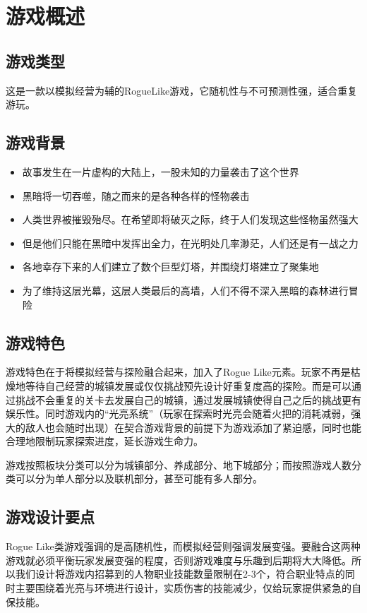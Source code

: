 \section{游戏概述}

\subsection{游戏类型}
这是一款以模拟经营为辅的RogueLike游戏，它随机性与不可预测性强，适合重复游玩。

\subsection{游戏背景}
\begin{itemize}
    \item 故事发生在一片虚构的大陆上，一股未知的力量袭击了这个世界
    \item 黑暗将一切吞噬，随之而来的是各种各样的怪物袭击
    \item 人类世界被摧毁殆尽。在希望即将破灭之际，终于人们发现这些怪物虽然强大
    \item 但是他们只能在黑暗中发挥出全力，在光明处几率渺茫，人们还是有一战之力
    \item 各地幸存下来的人们建立了数个巨型灯塔，并围绕灯塔建立了聚集地
    \item 为了维持这层光幕，这层人类最后的高墙，人们不得不深入黑暗的森林进行冒险
\end{itemize}

\subsection{游戏特色}
游戏特色在于将模拟经营与探险融合起来，加入了Rogue Like元素。玩家不再是枯燥地等待自己经营的城镇发展或仅仅挑战预先设计好重复度高的探险。而是可以通过挑战不会重复的关卡去发展自己的城镇，通过发展城镇使得自己之后的挑战更有娱乐性。同时游戏内的“光亮系统”（玩家在探索时光亮会随着火把的消耗减弱，强大的敌人也会随时出现）在契合游戏背景的前提下为游戏添加了紧迫感，同时也能合理地限制玩家探索进度，延长游戏生命力。

游戏按照板块分类可以分为城镇部分、养成部分、地下城部分；而按照游戏人数分类可以分为单人部分以及联机部分，甚至可能有多人部分。


\subsection{游戏设计要点}
Rogue Like类游戏强调的是高随机性，而模拟经营则强调发展变强。要融合这两种游戏就必须平衡玩家发展变强的程度，否则游戏难度与乐趣到后期将大大降低。所以我们设计将游戏内招募到的人物职业技能数量限制在2-3个，符合职业特点的同时主要围绕着光亮与环境进行设计，实质伤害的技能减少，仅给玩家提供紧急的自保技能。
